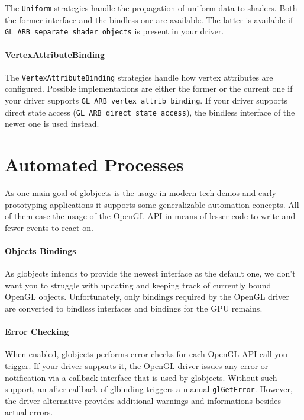 \documentclass{article}
\begin{document}
The \lstinline|Uniform| strategies handle the propagation of uniform data to shaders. Both the former interface and the bindless one are available. The latter is available if \lstinline|GL_ARB_separate_shader_objects| is present in your driver.

\paragraph{VertexAttributeBinding}

The \lstinline|VertexAttributeBinding| strategies handle how vertex attributes are configured. Possible implementations are either the former or the current one if your driver supports \lstinline|GL_ARB_vertex_attrib_binding|. If your driver supports direct state access (\lstinline|GL_ARB_direct_state_access|), the bindless interface of the newer one is used instead.

\section{Automated Processes}

As one main goal of globjects is the usage in modern tech demos and early-prototyping applications it supports some generalizable automation concepts.
All of them ease the usage of the OpenGL API in means of lesser code to write and fewer events to react on.

\paragraph{Objects Bindings}

As globjects intends to provide the newest interface as the default one, we don't want you to struggle with updating and keeping track of currently bound OpenGL objects. Unfortunately, only bindings required by the OpenGL driver are converted to bindless interfaces and bindings for the GPU remains.

\paragraph{Error Checking}

When enabled, globjects performs error checks for each OpenGL API call you trigger. If your driver supports it, the OpenGL driver issues any error or notification via a callback interface that is used by globjects. Without such support, an after-callback of glbinding triggers a manual \lstinline|glGetError|. However, the driver alternative provides additional warnings and informations besides actual errors.
\end{document}
